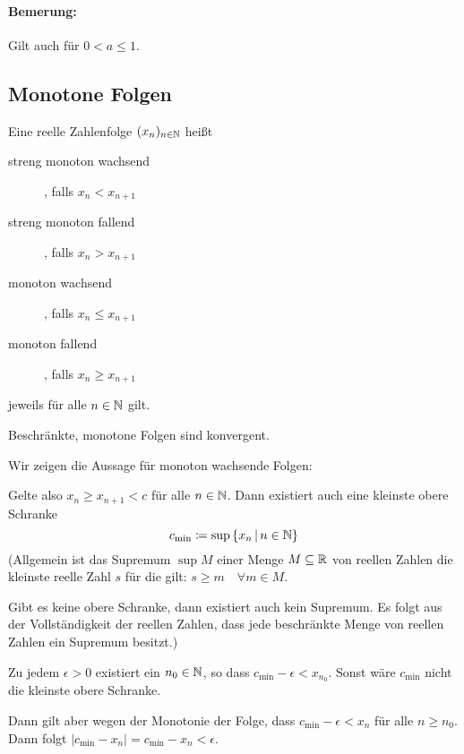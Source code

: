 \paragraph{Bemerung:} Gilt auch für $0<a\leq 1$.

\subsection{Monotone Folgen}
\begin{definition}{}
	Eine reelle Zahlenfolge $(x_n)_{n\in\mathbb{N}}$ heißt
	\begin{description}
		\item[streng monoton wachsend], falls $x_n<x_{n+1}$
		\item[streng monoton fallend], falls $x_n>x_{n+1}$
		\item[monoton wachsend], falls $x_n\leq x_{n+1}$
		\item[monoton fallend], falls $x_n\geq x_{n+1}$
	\end{description}
	jeweils für alle $n\in\mathbb{N}$ gilt.
\end{definition}

\begin{satz}{}
	Beschränkte, monotone Folgen sind konvergent.
\end{satz}
\beweis
Wir zeigen die Aussage für monoton wachsende Folgen:

Gelte also $x_n\geq x_{n+1}<c$ für alle $n\in\mathbb{N}$. Dann existiert auch eine kleinste obere Schranke
\begin{equation*}
	c_{\text{min}}\coloneqq \sup\left\{ x_n \,\middle|\, n\in\mathbb{N} \right\}
\end{equation*}
(Allgemein ist das Supremum $\sup M$ einer Menge $M\subseteq\mathbb{R}$ von reellen Zahlen die kleinste reelle Zahl $s$ für die gilt: $s\geq m\quad\forall m\in M$.

Gibt es keine obere Schranke, dann existiert auch kein Supremum. Es folgt aus der Vollständigkeit der reellen Zahlen, dass jede beschränkte Menge von reellen Zahlen ein Supremum besitzt.)

\par\medskip

Zu jedem $\epsilon>0$ existiert ein $n_0\in\mathbb{N}$, so dass $c_{\text{min}}-\epsilon<x_{n_0}$. Sonst wäre $c_{\text{min}}$ nicht die kleinste obere Schranke.

Dann gilt aber wegen der Monotonie der Folge, dass $c_{\text{min}}-\epsilon<x_n$ für alle $n\geq n_0$. Dann folgt $|c_{\text{min}}-x_n|=c_{\text{min}}-x_n<\epsilon$.


